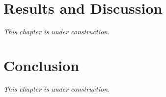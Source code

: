 \chapter{Results and Discussion}
\label{cap:resultados}

\emph{This chapter is under construction.}

\chapter{Conclusion}
\label{cap:conclusao}

\emph{This chapter is under construction.}
